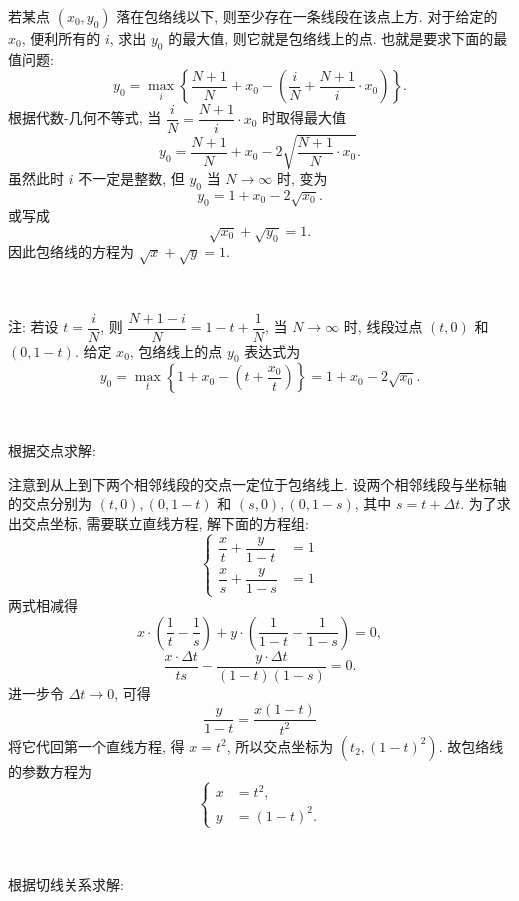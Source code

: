 若某点 $(x_0,y_0)$ 落在包络线以下, 则至少存在一条线段在该点上方. 对于给定的 $x_0$, 便利所有的 $i$, 求出 $y_0$ 的最大值, 则它就是包络线上的点. 也就是要求下面的最值问题:
\[y_0 = \mathop{\max}_i \left\{ \frac{N+1}{N} + x_0 - \left(\frac{i}{N} + \frac{N+1}{i}\cdot x_0\right) \right\} .\]
根据代数-几何不等式, 当 $\dfrac{i}{N} = \dfrac{N+1}{i}\cdot x_0$ 时取得最大值
\[ y_0 = \frac{N+1}{N} + x_0 - 2\sqrt{\frac{N+1}{N}\cdot x_0} .\]
虽然此时 $i$ 不一定是整数, 但 $y_0$ 
当 $N\to\infty$ 时, 变为
\[y_0 = 1 + x_0 - 2\sqrt{x_0} .\]
或写成
\[\sqrt{x_0}+\sqrt{y_0} = 1.\]
因此包络线的方程为 $\sqrt{x}+\sqrt{y}=1$.

~

注: 若设 $t = \dfrac{i}{N}$, 则 $\dfrac{N+1-i}{N} = 1 - t + \dfrac{1}{N}$, 当 $N\to\infty$ 时, 线段过点 $(t,0)$ 和 $(0,1-t)$. 给定 $x_0$, 包络线上的点 $y_0$ 表达式为
\[ y_0 = \mathop{\max}_t\left\{ 1+x_0 - (t+\frac{x_0}{t}) \right\} = 1 + x_0 - 2\sqrt{x_0} .\]


~

\noindent 根据交点求解: 

注意到从上到下两个相邻线段的交点一定位于包络线上. 设两个相邻线段与坐标轴的交点分别为 $(t,0), (0,1-t)$ 和 $(s, 0), (0, 1-s)$, 其中 $s = t+\Delta t$. 为了求出交点坐标, 需要联立直线方程, 解下面的方程组:
\[ \begin{cases}
\dfrac{x}{t} + \dfrac{y}{1-t} &= 1 \\
\dfrac{x}{s} + \dfrac{y}{1-s} &= 1
\end{cases}\]
两式相减得 
\[ x\cdot\left(\frac{1}{t} - \frac{1}{s}\right) + y\cdot \left(\frac{1}{1-t} - \frac{1}{1-s}\right) = 0,\]
\[\frac{x\cdot\Delta t}{ts} - \frac{y\cdot \Delta t}{(1-t)(1-s)} = 0 .\]
进一步令 $\Delta t \to 0$, 可得
\[ \frac{y}{1-t} = \frac{x(1-t)}{t^2} \]
将它代回第一个直线方程, 得 $x = t^2$, 所以交点坐标为 $(t_2, (1-t)^2)$. 故包络线的参数方程为
\[ \begin{cases}
x &= t^2, \\
y &= (1-t)^2 .
\end{cases}\]


~

\noindent 根据切线关系求解:
\begin{figure*}[htbp]
\centering
{}
\end{figure*}

